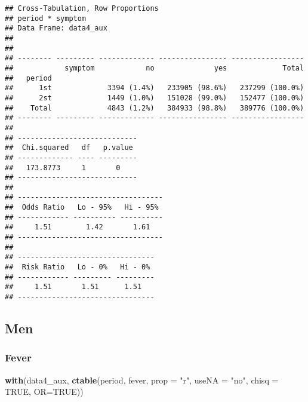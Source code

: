\documentclass[
]{article}
\newenvironment{Shaded}{\begin{snugshade}}{\end{snugshade}}
\newcommand{\DataTypeTok}[1]{\textcolor[rgb]{0.13,0.29,0.53}{#1}}
\newcommand{\KeywordTok}[1]{\textcolor[rgb]{0.13,0.29,0.53}{\textbf{#1}}}
\newcommand{\NormalTok}[1]{#1}
\newcommand{\OperatorTok}[1]{\textcolor[rgb]{0.81,0.36,0.00}{\textbf{#1}}}
\newcommand{\OtherTok}[1]{\textcolor[rgb]{0.56,0.35,0.01}{#1}}
\newcommand{\StringTok}[1]{\textcolor[rgb]{0.31,0.60,0.02}{#1}}
\begin{document}
\begin{verbatim}
## Cross-Tabulation, Row Proportions  
## period * symptom  
## Data Frame: data4_aux  
## 
## 
## -------- --------- ------------- ---------------- -----------------
##            symptom            no              yes             Total
##   period                                                           
##      1st             3394 (1.4%)   233905 (98.6%)   237299 (100.0%)
##      2st             1449 (1.0%)   151028 (99.0%)   152477 (100.0%)
##    Total             4843 (1.2%)   384933 (98.8%)   389776 (100.0%)
## -------- --------- ------------- ---------------- -----------------
## 
## ----------------------------
##  Chi.squared   df   p.value 
## ------------- ---- ---------
##   173.8773     1       0    
## ----------------------------
## 
## ----------------------------------
##  Odds Ratio   Lo - 95%   Hi - 95% 
## ------------ ---------- ----------
##     1.51        1.42       1.61   
## ----------------------------------
## 
## --------------------------------
##  Risk Ratio   Lo - 0%   Hi - 0% 
## ------------ --------- ---------
##     1.51       1.51      1.51   
## --------------------------------
\end{verbatim}

\hypertarget{men-2}{%
\subsection{Men}\label{men-2}}

\begin{Shaded}
\end{Shaded}

\hypertarget{fever-1}{%
\subsubsection{Fever}\label{fever-1}}

\begin{Shaded}
\begin{Highlighting}[]
\KeywordTok{with}\NormalTok{(data4_aux, }\KeywordTok{ctable}\NormalTok{(period, fever, }\DataTypeTok{prop =} \StringTok{"r"}\NormalTok{, }\DataTypeTok{useNA =} \StringTok{"no"}\NormalTok{, }\DataTypeTok{chisq =} \OtherTok{TRUE}\NormalTok{, }\DataTypeTok{OR=}\OtherTok{TRUE}\NormalTok{))}
\end{Highlighting}
\end{Shaded}
\end{document}
